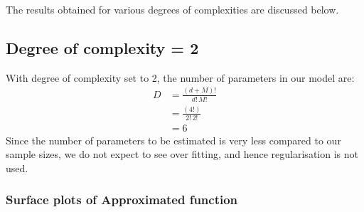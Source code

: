 \documentclass[12pt,a4paper]{article}
\newcommand{\noi}{\noindent}
\begin{document}
The results obtained for various degrees of complexities are discussed below. 

\subsection{Degree of complexity = 2}

With degree of complexity set to 2, the number of parameters in our model are:
\begin{equation}
\begin{split}
 D &= \frac{(d+M)!}{d!\,M!} \\
   & =\frac{(4!)}{2!\,2!} \\
   & =6
\end{split}
\end{equation}
\noi
Since the number of parameters to be estimated is very less compared to our sample sizes, we do not expect to see over fitting, and hence regularisation is not used. 

\subsubsection{Surface plots of Approximated function}
\end{document}
